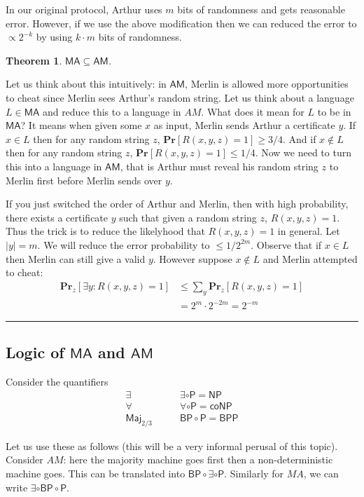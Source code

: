 \documentclass[twoside]{article}
\newcounter{lecnum}
\newtheorem{theorem}{Theorem}[lecnum]
\newenvironment{proof}{{\bf Proof:}}{\hfill\rule{2mm}{2mm}}
\def\Pr{\mathbf{Pr}}
\def\P{\mathsf{P}}
\def\NP{\mathsf{NP}}
\def\coNP{\mathsf{coNP}}
\def\BP{\mathsf{BP}}
\def\BPP{\mathsf{BPP}}
\def\Maj{\mathsf{Maj}}
\def\MA{\mathsf{MA}}
\def\AM{\mathsf{AM}}
\begin{document}
In our original protocol, Arthur uses $m$ bits of randomness and gets reasonable error. However, if we use the above modification then we can reduced the error to $\propto 2^{-k}$ by using $k \cdot m$ bits of randomness. 

\begin{theorem}
$\MA \subseteq \AM$.
\end{theorem} 
\begin{proof}
Let us think about this intuitively: in $\AM$, Merlin is allowed more opportunities to cheat since Merlin sees Arthur's random string. Let us think about a language $L \in \MA$ and reduce this to a language in $AM$. What does it mean for $L$ to be in $\MA$? It means when given some $x$ as input, Merlin sends Arthur a certificate $y$. If $x \in L$ then for any random string $z$, $\Pr[R(x,y,z) = 1] \geq 3/4$. And if $x \notin L$ then for any random string $z$, $\Pr[R(x,y,z) = 1] \leq 1/4$. Now we need to turn this into a language in $\AM$, that is Arthur must reveal his random string $z$ to Merlin first before Merlin sends over $y$. 

If you just switched the order of Arthur and Merlin, then with high probability, there exists a certificate $y$ such that given a random string $z$, $R(x,y,z) = 1$. Thus the trick is to reduce the likelyhood that $R(x,y,z) = 1$ in general. Let $|y| = m$. We will reduce the error probability to $\leq 1/2^{2m}$. Observe that if $x \in L$ then Merlin can still give a valid $y$. However suppose $x \notin L$ and Merlin attempted to cheat:
\begin{align*}
\Pr_z[\exists y: R(x,y,z) = 1] &\leq \sum_{y} \Pr_z[R(x,y,z) = 1] \\
&=2^{m} \cdot 2^{-2m} = 2^{-m}  
\end{align*}
\end{proof}

\subsection{Logic of $\MA$ and $\AM$}
Consider the quantifiers
\begin{align*}
\exists 	&\qquad \exists \circ \P = \NP \\
\forall 	&\qquad \forall \circ \P = \coNP \\
\Maj_{2/3}	&\qquad \BP \circ \P = \BPP
\end{align*}

Let us use these as follows (this will be a very informal perusal of this topic). Consider $AM$: here the majority machine goes first then a non-deterministic machine goes. This can be translated into $\BP \circ \exists \circ \P$. Similarly for $MA$, we can write $\exists \circ \BP \circ \P$.
\end{document}
